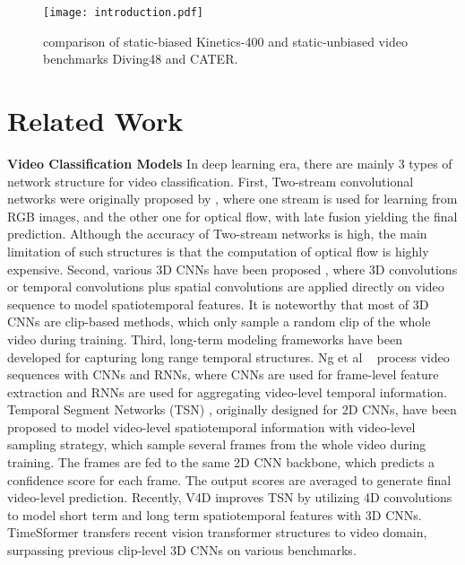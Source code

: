 \documentclass[nohyperref]{article}
\theoremstyle{plain}
\theoremstyle{definition}
\theoremstyle{remark}
\begin{document}
\begin{figure}[t]
  \centering
\texttt{[image: introduction.pdf]}

   \caption{comparison of static-biased Kinetics-400 and static-unbiased video benchmarks Diving48 and CATER.
   }
   \label{fig:intro}
\end{figure}
\section{Related Work}

{\bf Video Classification Models} In deep learning era, there are mainly 3 types of network structure for video classification. First, Two-stream convolutional networks were originally proposed by \cite{DBLP:conf/nips/SimonyanZ14}, where one stream is used for learning from RGB images, and the other one for optical flow, with late fusion yielding the final prediction. Although the accuracy of Two-stream networks is high,  the main limitation of such structures is that the computation of optical flow is highly expensive.
Second, various 3D CNNs have  been proposed  \cite{DBLP:conf/iccv/TranBFTP15,DBLP:conf/cvpr/CarreiraZ17,DBLP:conf/cvpr/WangL0G18,DBLP:conf/cvpr/0004GGH18,DBLP:journals/corr/abs-1812-03982}, where 3D convolutions or temporal convolutions plus spatial convolutions are applied directly on video sequence to model spatiotemporal features. It is noteworthy that most of 3D CNNs are clip-based methods, which only sample a random clip of the whole video during training.
Third, long-term modeling frameworks have been developed for capturing long range temporal structures.  Ng et al ~\cite{Ng15,DonahueJ2015} process video sequences with CNNs and RNNs, where CNNs are used for frame-level feature extraction and RNNs are used for aggregating video-level temporal information.
 Temporal Segment Networks (TSN) \cite{DBLP:conf/eccv/WangXW0LTG16}, originally designed for 2D CNNs, have been proposed to model video-level spatiotemporal information with video-level sampling strategy, which sample several frames from the whole video during training. The frames are fed to the same 2D CNN backbone, which predicts a confidence score for each frame. The output scores are averaged to generate final video-level prediction. Recently, V4D \cite{Zhang2020V4D:} improves TSN by utilizing 4D convolutions to model short term and long term spatiotemporal features with 3D CNNs. TimeSformer\cite{bertasius2021spacetime} transfers recent vision transformer\cite{dosovitskiy2021an} structures to video domain, surpassing previous clip-level 3D CNNs on various benchmarks. 
 
\end{document}
